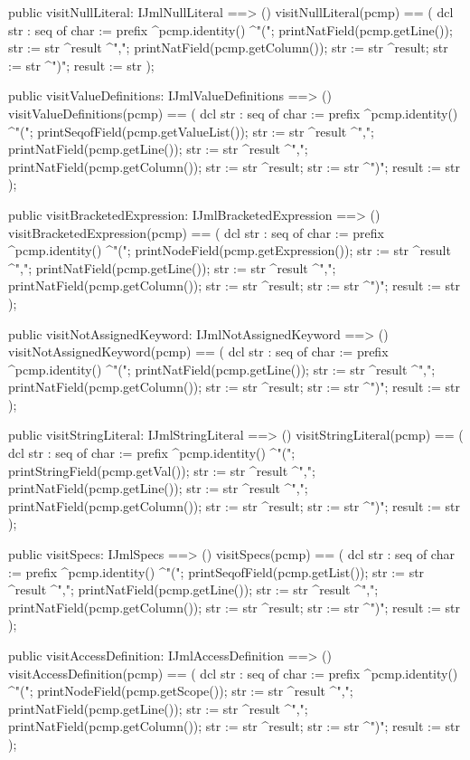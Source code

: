 \begin{vdm_al}
  public visitNullLiteral: IJmlNullLiteral ==> ()
  visitNullLiteral(pcmp) ==
    ( dcl str : seq of char := prefix ^pcmp.identity() ^"(";
      printNatField(pcmp.getLine());
      str := str ^result ^",";
      printNatField(pcmp.getColumn());
      str := str ^result;
      str := str ^")";
      result := str );

  public visitValueDefinitions: IJmlValueDefinitions ==> ()
  visitValueDefinitions(pcmp) ==
    ( dcl str : seq of char := prefix ^pcmp.identity() ^"(";
      printSeqofField(pcmp.getValueList());
      str := str ^result ^",";
      printNatField(pcmp.getLine());
      str := str ^result ^",";
      printNatField(pcmp.getColumn());
      str := str ^result;
      str := str ^")";
      result := str );

  public visitBracketedExpression: IJmlBracketedExpression ==> ()
  visitBracketedExpression(pcmp) ==
    ( dcl str : seq of char := prefix ^pcmp.identity() ^"(";
      printNodeField(pcmp.getExpression());
      str := str ^result ^",";
      printNatField(pcmp.getLine());
      str := str ^result ^",";
      printNatField(pcmp.getColumn());
      str := str ^result;
      str := str ^")";
      result := str );

  public visitNotAssignedKeyword: IJmlNotAssignedKeyword ==> ()
  visitNotAssignedKeyword(pcmp) ==
    ( dcl str : seq of char := prefix ^pcmp.identity() ^"(";
      printNatField(pcmp.getLine());
      str := str ^result ^",";
      printNatField(pcmp.getColumn());
      str := str ^result;
      str := str ^")";
      result := str );

  public visitStringLiteral: IJmlStringLiteral ==> ()
  visitStringLiteral(pcmp) ==
    ( dcl str : seq of char := prefix ^pcmp.identity() ^"(";
      printStringField(pcmp.getVal());
      str := str ^result ^",";
      printNatField(pcmp.getLine());
      str := str ^result ^",";
      printNatField(pcmp.getColumn());
      str := str ^result;
      str := str ^")";
      result := str );

  public visitSpecs: IJmlSpecs ==> ()
  visitSpecs(pcmp) ==
    ( dcl str : seq of char := prefix ^pcmp.identity() ^"(";
      printSeqofField(pcmp.getList());
      str := str ^result ^",";
      printNatField(pcmp.getLine());
      str := str ^result ^",";
      printNatField(pcmp.getColumn());
      str := str ^result;
      str := str ^")";
      result := str );

  public visitAccessDefinition: IJmlAccessDefinition ==> ()
  visitAccessDefinition(pcmp) ==
    ( dcl str : seq of char := prefix ^pcmp.identity() ^"(";
      printNodeField(pcmp.getScope());
      str := str ^result ^",";
      printNatField(pcmp.getLine());
      str := str ^result ^",";
      printNatField(pcmp.getColumn());
      str := str ^result;
      str := str ^")";
      result := str );


\end{vdm_al}

